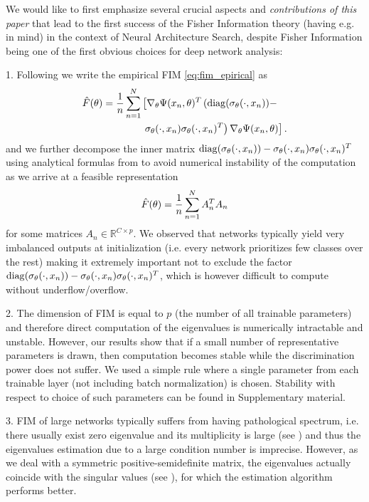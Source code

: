 We would like to first emphasize several crucial aspects and \textit{contributions of this paper} that lead to the first success of the Fisher Information theory (having e.g. \cite{abdelfattah2021zero} in mind) in the context of Neural Architecture Search, despite Fisher Information being one of the first obvious choices for deep network analysis:

1. Following \cite{kunstner2019limitations} we write the empirical FIM \eqref{eq:fim_epirical} as
\begin{align}
    \Hat{F}(\theta)=\frac{1}{n}\sum_{n=1}^{N}&\left[\nabla_\theta\Psi (x_n,\theta)^T\left(\operatorname{diag}(\sigma_\theta(\cdot, x_n))-\right.\right.\nonumber\\
    &\left.\left.\sigma_\theta(\cdot, x_n)\sigma_\theta(\cdot, x_n)^T\right)\nabla_\theta\Psi (x_n,\theta)\right].
\end{align}
and we further decompose the inner matrix $\operatorname{diag}(\sigma_\theta(\cdot, x_n))-\sigma_\theta(\cdot, x_n)\sigma_\theta(\cdot, x_n)^T$ using analytical formulas from \cite{tanabe1992exact} to avoid numerical instability of the computation as we arrive at a feasible representation
\begin{align}
    \Hat{F}(\theta)=\frac{1}{n}\sum_{n=1}^{N}A_n^TA_n
\end{align}
for some matrices $A_n\in\mathbb{R}^{C\times p}$. We observed that networks typically yield very imbalanced outputs at initialization (i.e. every network prioritizes few classes over the rest) making it extremely important not to exclude the factor $\operatorname{diag}(\sigma_\theta(\cdot, x_n))-\sigma_\theta(\cdot, x_n)\sigma_\theta(\cdot, x_n)^T$, which is however difficult to compute without underflow/overflow.

2. The dimension of FIM is equal to $p$ (the number of all trainable parameters) and therefore direct computation of the eigenvalues is numerically intractable and unstable. However, our results show that if a small number of representative parameters is drawn, then computation becomes stable while the discrimination power does not suffer. We used a simple rule where a single parameter from each trainable layer (not including batch normalization) is chosen. Stability with respect to choice of such parameters can be found in Supplementary material.
    
3. FIM of large networks typically suffers from having pathological spectrum, i.e. there usually exist zero eigenvalue and its multiplicity is large (see \cite{karakida2019pathological}) and thus the eigenvalues estimation due to a large condition number is imprecise. However, as we deal with a symmetric positive-semidefinite matrix, the eigenvalues actually coincide with the singular values (see \cite{leon2006linear}), for which the estimation algorithm performs better.


